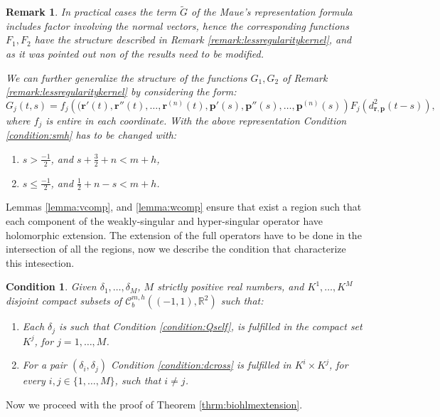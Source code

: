 \documentclass{article}
\newtheorem{remark}[theorem]{Remark}
\newtheorem{condition}[theorem]{Condition}
\newcommand{\IR}{{\mathbb R}}
\newcommand{\bp}{{\bm p}}
\newcommand{\rgeoh}[2]{\mathcal{C}_b^{#1,#2}\left( (-1,1), \IR^2 \right)}
\newcommand{\br}{\bm{r}}
\begin{document}
\begin{remark}
In practical cases the term $\widetilde{G}$ of the Maue's representation formula includes factor involving the normal vectors, hence the corresponding functions $F_1,F_2$ have the structure described in Remark \ref{remark:lessregularitykernel}, and as it was pointed out non of the results need to be modified.

We can further generalize the structure of the functions $G_1,G_2$ of Remark \ref{remark:lessregularitykernel} by considering the form:
$$
G_j(t,s) = f_j\left((\br'(t),\br''(t),\hdots,\br^{(n)}(t),\bp'(s),\bp''(s),\hdots,\bp^{(n)}(s)\right)F_j(d_{\br,\bp}^2(t-s)),
$$
where $f_j$ is entire in each coordinate. With the above representation Condition \ref{condition:smh} has to be changed with:
\begin{enumerate}
\item[i] 
$s > \frac{-1}{2}$, and $s+
\frac{3}{2}+n<m+h$,
\item[ii] 
$ s \leq \frac{-1}{2}$, and $\frac{1}{2}+n -s < m+h$.
\end{enumerate}  
\end{remark}
Lemmas \ref{lemma:vcomp}, and \ref{lemma:wcomp} ensure that exist a region such that each component of the weakly-singular and hyper-singular operator have holomorphic extension. The extension of the full operators have to be done in the intersection of all the regions, now we describe the condition that characterize this intesection. 

\begin{condition}
\label{condition:deltaOps}
Given $\delta_1,\hdots,\delta_M$, $M$ strictly positive real numbers, and $K^1,\hdots,K^M$ disjoint compact subsets of $\rgeoh{m}{h}$ such that: 
\begin{enumerate}
\item[i] Each $\delta_j$ is such that Condition \ref{condition:Qself}, is fulfilled in the compact set $K^j$, for $j=1,\hdots,M$.
\item[ii]
For a pair $(\delta_i, \delta_j)$ Condition \ref{condition:dcross} is fulfilled in $K^i\times K^j$, for every $i,j \in \{1,\hdots,M\}$, such that $i \neq j$.
\end{enumerate} 
\end{condition}

Now we proceed with the proof of Theorem \ref{thrm:biohlmextension}.
\end{document}
